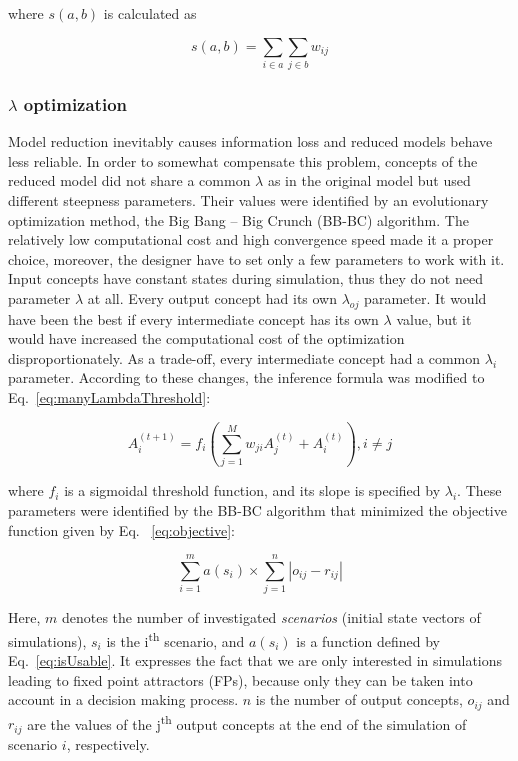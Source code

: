 \documentclass[graybox]{svmult}
\begin{document}
\noindent where $s(a,b)$ is calculated as

\begin{equation}
  \label{eq:sum}
  s(a,b) = \sum_{i \in a} \sum_{j \in b} w_{ij}
\end{equation}

\subsubsection{$\lambda$ optimization}
\label{sec:lambdaOptimization}

Model reduction inevitably causes information loss and reduced 
models behave less reliable. In order to somewhat compensate this 
problem, concepts of the reduced model did not share a common 
$\lambda$ as in the original model but used different steepness 
parameters. Their values were identified by an evolutionary 
optimization method, the Big Bang -- Big Crunch (BB-BC) \cite
{yesilenginurbasleon2010} algorithm. The relatively low 
computational cost and high convergence speed made it a proper choice, 
moreover, the designer have to set only a few parameters to work 
with it. Input concepts have constant states during simulation, thus 
they do not need parameter $\lambda$ at all. Every output concept 
had its own $\lambda_{oj}$ parameter. It would have been the best if 
every intermediate concept has its own $\lambda$ value, but it 
would have increased the computational cost of the optimization 
disproportionately. As a trade-off, every intermediate concept had a 
common $\lambda_{i}$ parameter. According to these changes, the 
inference formula was modified to Eq.~\ref{eq:manyLambdaThreshold}:

\begin{equation}
  \label{eq:manyLambdaThreshold}
  A_i^{(t+1)} = f_i\left(\sum_{j=1}^{M} w_{ji}A_j^{(t)} + A_i^{(t)}\right), i \neq j
\end{equation}

\noindent where $f_i$ is a sigmoidal threshold function, and its slope is 
specified by $\lambda_i$. These parameters were identified by the 
BB-BC algorithm that minimized the objective function given by Eq.~
\ref{eq:objective}:

\begin{equation}
  \label{eq:objective}
  \sum_{i=1}^{m} a(s_i) \times \sum_{j=1}^{n} |o_{ij} - r_{ij}|
\end{equation}

Here, $m$ denotes the number of investigated \emph{scenarios} (initial 
state vectors of simulations), $s_i$ is the i\textsuperscript{th} 
scenario, and $a(s_i)$ is a function defined by Eq.~\ref{eq:isUsable}. 
It expresses the fact that we are only interested in simulations 
leading to fixed point attractors (FPs), because only they can be taken into 
account in a decision making process. $n$ is the number of output 
concepts, $o_{ij}$ and $r_{ij}$ are the values of the 
j\textsuperscript{th} output concepts at the end of the simulation of 
scenario $i$, respectively.
\end{document}
